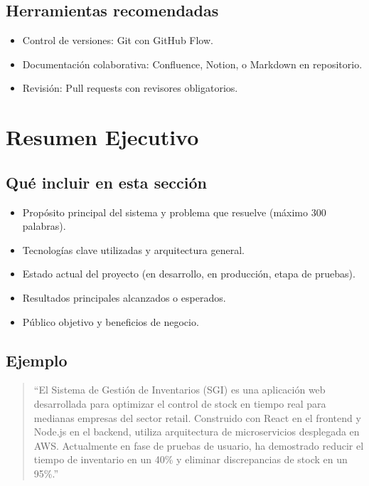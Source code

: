 \documentclass[a4paper,11pt,spanish]{article}
\begin{document}
\subsection*{Herramientas recomendadas}

\begin{itemize}
    \item Control de versiones: Git con GitHub Flow.
    \item Documentación colaborativa: Confluence, Notion, o Markdown en repositorio.
    \item Revisión: Pull requests con revisores obligatorios.
\end{itemize}

\newpage

\section{Resumen Ejecutivo}

\subsection*{Qué incluir en esta sección}

\begin{itemize}
    \item Propósito principal del sistema y problema que resuelve (máximo 300 palabras).
    \item Tecnologías clave utilizadas y arquitectura general.
    \item Estado actual del proyecto (en desarrollo, en producción, etapa de pruebas).
    \item Resultados principales alcanzados o esperados.
    \item Público objetivo y beneficios de negocio.
\end{itemize}

\subsection*{Ejemplo}

\begin{quote}
``El Sistema de Gestión de Inventarios (SGI) es una aplicación web desarrollada para optimizar el control de stock en tiempo real para medianas empresas del sector retail. Construido con React en el frontend y Node.js en el backend, utiliza arquitectura de microservicios desplegada en AWS. Actualmente en fase de pruebas de usuario, ha demostrado reducir el tiempo de inventario en un 40\% y eliminar discrepancias de stock en un 95\%.''
\end{quote}
\end{document}
